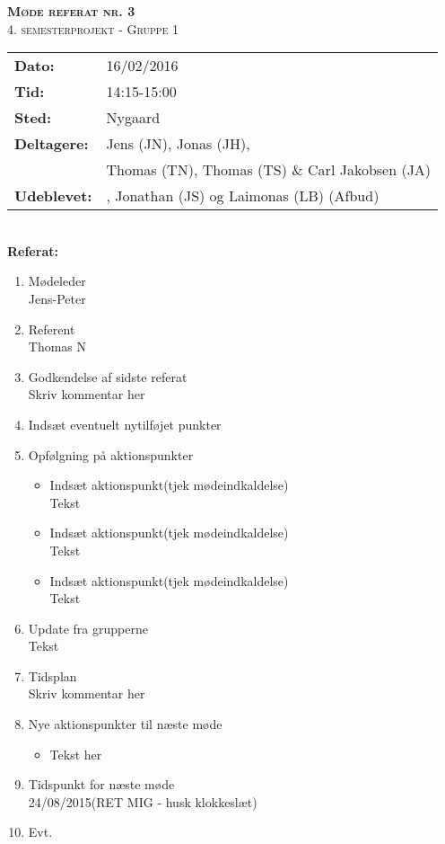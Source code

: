 
\newcommand{\HRule}{\rule{\linewidth}{0.1mm}}


	\begin{center}
		{\huge \bfseries \textsc{Møde referat nr. 3}}\\
		\textsc{\large 4. semesterprojekt - Gruppe 1}\\[0.3cm]
	\end{center}
	\begin{tabular}{ll}
	\large \textbf{Dato:} & 16/02/2016  \\ %
	\large \textbf{Tid:}  & 14:15-15:00 \\ %
	\large \textbf{Sted:} & Nygaard		\\ %
	\large \textbf{Deltagere:} & Jens (JN), Jonas (JH), \\
	\large \textbf & Thomas (TN),  Thomas (TS) \& Carl Jakobsen (JA)\\
	\large \textbf{Udeblevet:} & , Jonathan (JS) og Laimonas (LB) (Afbud)	\\
	\end{tabular}\\
	\phantom{\,}\hspace{0.1em} \large \textbf{Referat:}
	\begin{enumerate}
		\itemsep 0.3em 
		\item Mødeleder\\
			Jens-Peter
		\item Referent\\
			Thomas N
		\item Godkendelse af sidste referat\\
			Skriv kommentar her
			
		\item Indsæt eventuelt nytilføjet punkter\\
			
		\item Opfølgning på aktionspunkter
		\begin{itemize}
			\itemsep 0.3em 
			\item Indsæt aktionspunkt(tjek mødeindkaldelse)\\
				Tekst
			\item Indsæt aktionspunkt(tjek mødeindkaldelse)\\
				Tekst
			\item Indsæt aktionspunkt(tjek mødeindkaldelse)\\
				Tekst
		\end{itemize}
		\item Update fra grupperne\\
			Tekst
		\item Tidsplan\\
			Skriv kommentar her
		\item Nye aktionspunkter til næste møde
		\begin{itemize}
			\itemsep 0.3em 
		\item Tekst her
		\end{itemize}
		\item Tidspunkt for næste møde\\
			24/08/2015(RET MIG - husk klokkeslæt)
		\item Evt.
	\end{enumerate}

